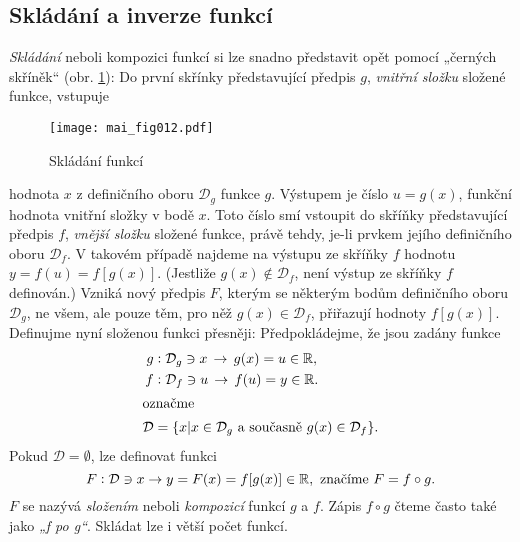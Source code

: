     \subsection{Skládání a inverze funkcí}
      \emph{Skládání} neboli kompozici funkcí si lze snadno představit opět pomocí „černých 
      skříněk“ (obr. \ref{mai_fig012}): Do první skřínky představující předpis \(g\), \emph{vnitřní 
      složku} složené funkce, vstupuje
      \begin{figure}[ht!] %
        \centering
%        
        \texttt{[image: mai\_fig012.pdf]}
        \caption{Skládání funkcí \cite[s.~59]{Musilova2009MA1}}
        \label{mai_fig012}
      \end{figure}
      hodnota \(x\) z definičního oboru \(\mathcal{D}_g\) funkce \(g\). Výstupem je číslo \(u = 
      g(x)\), funkční hodnota vnitřní složky v bodě \(x\). Toto číslo smí vstoupit do skříňky 
      představující předpis \(f\), \emph{vnější složku} složené funkce, právě tehdy, je-li prvkem 
      jejího definičního oboru \(\mathcal{D}_f\). V takovém případě najdeme na výstupu ze skříňky 
      \(f\) hodnotu \(y = f(u) = f[g(x)]\). (Jestliže \(g(x)\notin\mathcal{D}_f\), není výstup ze 
      skříňky \(f\) definován.) Vzniká nový předpis \(F\), kterým se některým bodům definičního 
      oboru \(\mathcal{D}_g\), ne všem, ale pouze těm, pro něž \(g(x)\in\mathcal{D}_f\), 
      přiřazují hodnoty \(f[g(x)]\). Definujme nyní složenou funkci přesněji: Předpokládejme, že 
      jsou zadány funkce
      \begin{align*}
        g  &: \mathcal{D}_g\ni x\,\rightarrow\, g(x) = u\in\mathbb{R}, \\
        f  &: \mathcal{D}_f\ni u\,\rightarrow\, f(u) = y\in\mathbb{R}. \\
        \shortintertext{označme}
        \mathcal{D} &= \{x|x\in\mathcal{D}_g \text{ a současně } g(x)\in\mathcal{D}_f\}.
      \end{align*}
      Pokud \(\mathcal{D} = \emptyset\), lze definovat funkci
      \begin{equation*}
        F: \mathcal{D}\ni x\rightarrow y = F(x) = f[g(x)]\in\mathbb{R}, 
           \text{ značíme } F = f \circ g.
      \end{equation*}
      \(F\) se nazývá \emph{složením} neboli \emph{kompozicí} funkcí \(g\) a \(f\). Zápis \(f\circ 
      g\) čteme často také jako \emph{„f po g“}. Skládat lze i větší počet funkcí.

         
      
